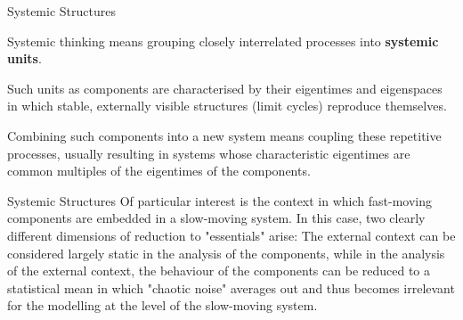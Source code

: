 \documentclass{beamer}
\title{Modelling Sustainable Systems\\ and Semantic Web\\[6pt]
  Systemic Structures and Action Spaces
  \vskip1em}
\subtitle{Lecture in the Module 10-202-2309\\ for Master Computer Science}
\author{Prof. Dr. Hans-Gert Gräbe\\
\url{http://www.informatik.uni-leipzig.de/~graebe}}
\date{November 2021}
\begin{document}
{
\begin{frame}
  \titlepage
\end{frame}}

\begin{frame}{Systemic Structures}

Systemic thinking means grouping closely interrelated processes into
\textbf{systemic units}.

Such units as components are characterised by their eigentimes and eigenspaces
in which stable, externally visible structures (limit cycles) reproduce
themselves.

Combining such components into a new system means coupling these repetitive
processes, usually resulting in systems whose characteristic eigentimes are
common multiples of the eigentimes of the components.

\end{frame}

\begin{frame}{Systemic Structures}
Of particular interest is the context in which fast-moving components are
embedded in a slow-moving system. In this case, two clearly different
dimensions of reduction to "essentials" arise: The external context can be
considered largely static in the analysis of the components, while in the
analysis of the external context, the behaviour of the components can be
reduced to a statistical mean in which "chaotic noise" averages out and thus
becomes irrelevant for the modelling at the level of the slow-moving system.

\end{frame}
\end{document}
